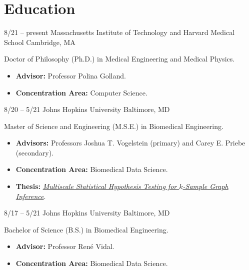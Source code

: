 \section{Education}

\cventry
{8/21 -- present}
{Massachusetts Institute of Technology and Harvard Medical School}
{}
{Cambridge, MA}
{}
{
Doctor of Philosophy (Ph.D.) in Medical Engineering and Medical Physics.
\begin{itemize}
    \item \textbf{Advisor:} Professor Polina Golland.
    \item \textbf{Concentration Area:} Computer Science.
\end{itemize}
}


\cventry
{8/20 -- 5/21}
{Johns Hopkins University}
{}
{Baltimore, MD}
{}
{
Master of Science and Engineering (M.S.E.) in Biomedical Engineering.
\begin{itemize}
    \item \textbf{Advisors:} Professors Joshua T. Vogelstein (primary) and Carey E. Priebe (secondary).
    \item \textbf{Concentration Area:} Biomedical Data Science.
    \item \textbf{Thesis:} \textit{\href{https://jscholarship.library.jhu.edu/handle/1774.2/64239}{Multiscale Statistical Hypothesis Testing for $k$-Sample Graph Inference}}.
\end{itemize}
}

\cventry
{8/17 -- 5/21}
{Johns Hopkins University}
{}
{Baltimore, MD}
{}
{
Bachelor of Science (B.S.) in Biomedical Engineering.
\begin{itemize}
    \item \textbf{Advisor:} Professor Ren\'{e} Vidal.
    \item \textbf{Concentration Area:} Biomedical Data Science.
\end{itemize}
}
